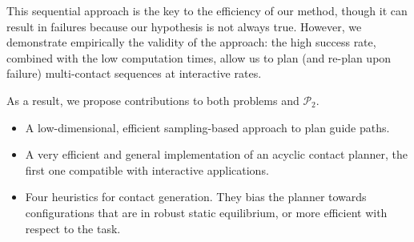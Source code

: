 This sequential approach is the key to the efficiency of our method, though it
can result in failures because our hypothesis is not always true. However, we demonstrate empirically the validity of the approach: the high success rate, combined with the low computation times, allow us to plan (and re-plan upon failure) multi-contact sequences at \gls{interactive} rates.

As a result, we propose contributions to both problems \Pa and $\mathcal{P}_2$.
\begin{itemize}
\item A low-dimensional, efficient sampling-based approach to plan guide paths.
\item A very efficient and general implementation of an acyclic contact planner, the first one compatible with \gls{interactive} applications.
\item Four heuristics for contact generation. They bias the planner towards configurations that are in robust static equilibrium, or 
more efficient with respect to the task.
\end{itemize}


